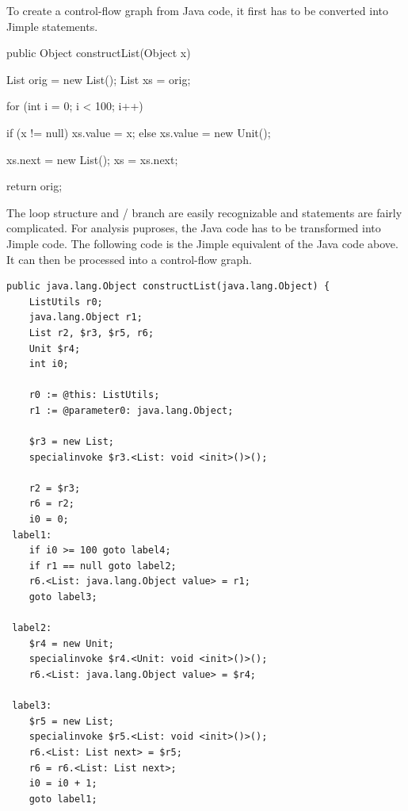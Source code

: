 \begin{example}
To create a control-flow graph from Java code, it first has to be converted into Jimple statements.
\begin{javacode}
public Object constructList(Object x) {
    List orig = new List();
    List xs = orig;
    
    for (int i = 0; i < 100; i++) {
        if (x != null) {
            xs.value = x;
        } else {
            xs.value = new Unit();
        }

        xs.next = new List();
        xs = xs.next;
    }
    return orig;
}
\end{javacode}
The loop structure and / branch are easily recognizable and statements are fairly complicated. For analysis puproses, the Java code has to be transformed into Jimple code.
The following code is the Jimple equivalent of the Java code above. It can then be processed into a control-flow graph.
\pagebreak
\begin{verbatim}
public java.lang.Object constructList(java.lang.Object) {
    ListUtils r0;
    java.lang.Object r1;
    List r2, $r3, $r5, r6;
    Unit $r4;
    int i0;
    
    r0 := @this: ListUtils;
    r1 := @parameter0: java.lang.Object;
    
    $r3 = new List;
    specialinvoke $r3.<List: void <init>()>();
    
    r2 = $r3;
    r6 = r2;
    i0 = 0;
 label1:
    if i0 >= 100 goto label4;
    if r1 == null goto label2;
    r6.<List: java.lang.Object value> = r1;
    goto label3;

 label2:
    $r4 = new Unit;
    specialinvoke $r4.<Unit: void <init>()>();
    r6.<List: java.lang.Object value> = $r4;

 label3:
    $r5 = new List;
    specialinvoke $r5.<List: void <init>()>();
    r6.<List: List next> = $r5;
    r6 = r6.<List: List next>;
    i0 = i0 + 1;
    goto label1;


\end{verbatim}
\end{example}
